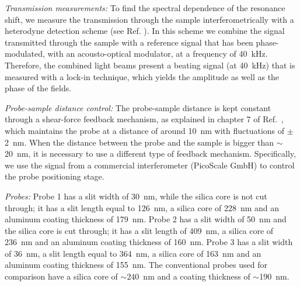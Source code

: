 \documentclass{osa-article}
\begin{document}
	\textit{Transmission measurements:} To find the spectral dependence of the resonance shift, we measure the transmission through the sample interferometrically with a heterodyne detection scheme (see Ref. \cite{Feber_2013}). In this scheme we combine the signal transmitted through the sample with a reference signal that has been phase-modulated, with an acousto-optical modulator, at a frequency of 40~kHz. Therefore, the combined light beams present a beating signal (at 40~kHz) that is measured with a lock-in technique, which yields the amplitude as well as the phase of the fields.\par
	\textit{Probe-sample distance control:} The probe-sample distance is kept constant through a shear-force feedback mechanism, as explained in chapter 7 of Ref.~\cite{Novotny2006}, which maintains the probe at a distance of around 10~nm with fluctuations of $\pm$2~nm. When the distance between the probe and the sample is bigger than $\sim$20~nm, it is necessary to use a different type of feedback mechanism. Specifically, we use the signal from a commercial interferometer (PicoScale GmbH) to control the probe positioning stage.\par
	\textit{Probes:} Probe 1 has a slit width of 30~nm, while the silica core is not cut through; it has a slit length equal to 126~nm, a silica core of 228~nm and an aluminum coating thickness of 179~nm. Probe 2 has a slit width of 50~nm and the silica core is cut through; it has a slit length of 409~nm, a silica core of 236~nm and an aluminum coating thickness of 160~nm. Probe 3 has a slit width of 36~nm, a slit length equal to 364~nm, a silica core of 163~nm and an aluminum coating thickness of 155~nm. The conventional probes used for comparison have a silica core of $\sim$240~nm and a coating thickness of $\sim$190~nm.\par 
\end{document}
